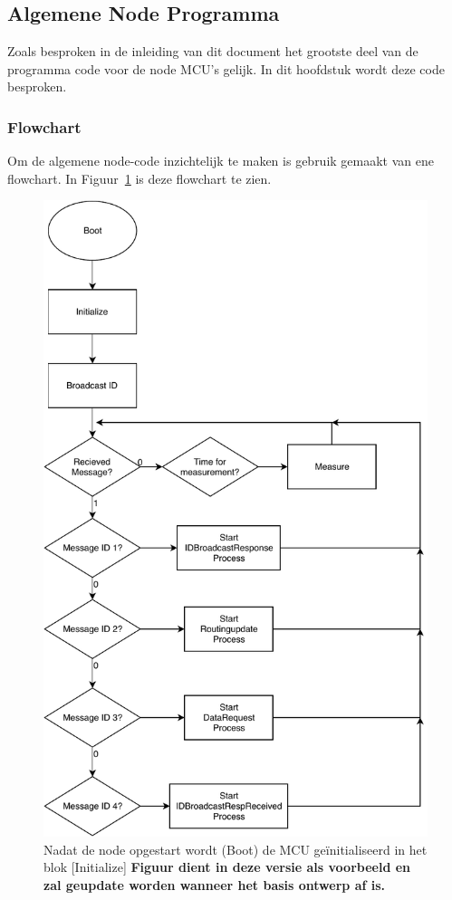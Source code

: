 \subsection{Algemene Node Programma}
Zoals besproken in de inleiding van dit document het grootste deel van de programma code voor de node MCU's gelijk. In dit hoofdstuk wordt deze code besproken. 
\subsubsection{Flowchart}
Om de algemene node-code inzichtelijk te maken is gebruik gemaakt van ene flowchart. In Figuur~\ref{fig:flowchart} is deze flowchart te zien.
\begin{figure}[!h]
	\centering	
	\includegraphics[width=.5\textwidth, keepaspectratio]{App2/media/Pflow.pdf}
    \caption{Nadat de node opgestart wordt (Boot) de MCU geïnitialiseerd in het blok [Initialize]
     \textbf{Figuur dient in deze versie als voorbeeld en zal geupdate worden wanneer het basis ontwerp af is.}}
    \label{fig:flowchart}
\end{figure}

